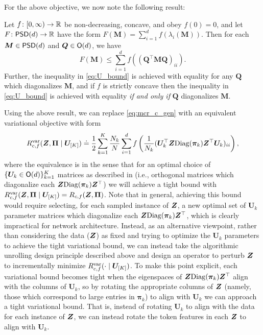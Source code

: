 \documentclass[\toplevelprefix/book-main.tex]{subfiles}
\begin{document}
For the above objective, we now note the following result:
\begin{theorem}
\label{thm:var_concave}
    Let \(f \colon [0, \infty) \to \mathbb{R}\) be non-decreasing, concave, and obey \(f(0) = 0\), and let \(F \colon \mathsf{PSD}(d) \to \mathbb{R}\) have the form \(F(\bm M) = \sum_{i = 1}^{d}f(\lambda_{i}(\bm M))\). Then for each \(\bm M \in \mathsf{PSD}(d)\) and \(\bm Q \in \mathsf{O}(d)\), we have
    \begin{equation}
        \label{eq:U_bound}
        F(\bm M) \leq  \sum_{i=1}^{d} f\left( (\bm Q^{\top} \bm M \bm Q)_{ii} \right).
    \end{equation}
    Further, the inequality in \eqref{eq:U_bound} is achieved with equality for any $\bm Q$ which diagonalizes $\bm M$, and if $f$ is strictly concave then the inequality in \eqref{eq:U_bound} is achieved with equality \textit{if and only if} $\bm Q$ diagonalizes $\bm M$. 
\end{theorem}

Using the above result, we can replace \eqref{eq:mcr_c_gen} with an equivalent variational objective with form
\vspace{-2mm}
\begin{equation}
    \label{eq:var_comp}
    R^{\rm var}_{c,f} (\bm{Z},\bm \Pi \mid \bm U_{[K]}) \doteq \frac{1}{2}\sum_{k=1}^K \frac{N_k}{N} \sum_{i=1}^{d} f\left(\frac{1}{N_k} (\bm U_{k}^{\top} \bm{Z} \mathrm{Diag}(\bm \pi_k) \bm Z^{\top} \bm U_{k})_{ii} \right),
\end{equation}
where the equivalence is in the sense that for an optimal choice of $\{ \bm U_k \in \mathsf{O}(d)\}_{k=1}^K$ matrices as described in  (i.e., orthogonal matrices which diagonalize each $\bm{Z} \mathrm{Diag}(\bm \pi_k) \bm{Z}^\top $) we will achieve a tight bound with $ R^{\rm var}_{c,f} (\bm{Z},\bm \Pi \mid \bm U_{[K]}) = R_{c,f} (\bm{Z},\bm \Pi)$. Note that in general, achieving this bound would require selecting, for each sampled instance of $\bm{Z}$, a new optimal set of $\bm U_{k}$ parameter matrices which diagonalize each $\bm{Z}\mathrm{Diag}(\bm \pi_{k})\bm{Z}^{\top}$, which is clearly impractical for network architecture. 
Instead, as an alternative viewpoint, rather than considering the data ($\bm{Z}$) as fixed and trying to optimize the $\bm U_k$ parameters to achieve the tight variational bound, we can instead take the algorithmic unrolling design principle described above and design an operator to perturb $\bm{Z}$ to incrementally minimize $R_{c, f}^{\rm var}(\cdot \mid \bm U_{[K]})$.  To make this point explicit, each variational bound becomes tight when the eigenspaces of $\bm{Z} \mathrm{Diag}(\bm \pi_k) \bm{Z}
^\top$ align with the columns of $\bm U_k$, so by rotating the appropriate columns of $\bm{Z}$ (namely, those which correspond to large entries in $\bm \pi_k$) to align with $\bm U_k$ we can approach a tight variational bound. That is, instead of rotating $\bm U_k$ to align with the data for each instance of $\bm{Z}$, we can instead rotate the token features in each $\bm{Z}$ to align with $\bm U_k$. 
\end{document}
